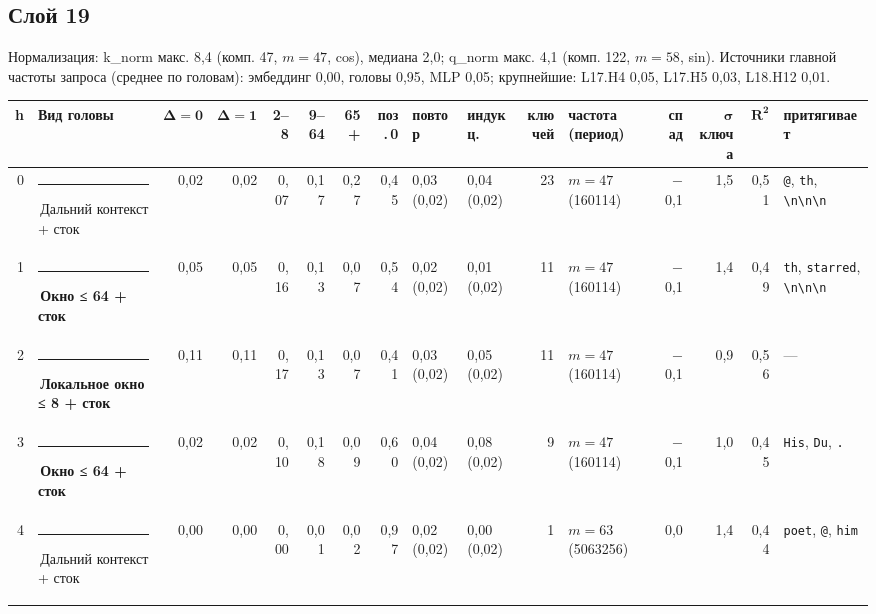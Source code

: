 \documentclass[10pt]{article}
\begin{document}
\noindent\begin{minipage}{\linewidth}
\subsection*{Слой 19}
{\small\color{ink2} Нормализация: k\_norm макс. 8,4 (комп. 47, $m{=}47$, cos), медиана 2,0; q\_norm макс. 4,1 (комп. 122, $m{=}58$, sin). Источники главной частоты запроса (среднее по головам): эмбеддинг 0,00, головы 0,95, MLP 0,05; крупнейшие: L17.H4 0,05, L17.H5 0,03, L18.H12 0,01.}
\begin{center}{\footnotesize\begin{tabular}{|r|l|r|r|r|r|r|r|l|l|r|l|r|r|r|l|}
\hline
\rowcolor{head}\textbf{h} & \textbf{Вид головы} & $\boldsymbol{\Delta{=}0}$ & $\boldsymbol{\Delta{=}1}$ & \textbf{2–8} & \textbf{9–64} & \textbf{65+} & \textbf{поз.\,0} & \textbf{повтор} & \textbf{индукц.} & \textbf{ключей} & \textbf{частота (период)} & \textbf{спад} & $\boldsymbol{\sigma}$ \textbf{ключа} & $\boldsymbol{R^2}$ & \textbf{притягивает} \\ \hline
0 & \textcolor[HTML]{C3C2B7}{\rule{0.62em}{0.62em}}\,Дальний контекст + сток & 0,02 & 0,02 & 0,07 & 0,17 & 0,27 & 0,45 & 0,03 (0,02) & 0,04 (0,02) & 23 & $m{=}47$ (160114) & $-$0,1 & 1,5 & 0,51 & \texttt{\textvisiblespace{}@}, \texttt{th}, \texttt{\textvisiblespace{}\textbackslash{}n\textbackslash{}n\textbackslash{}n} \\ \hline
1 & \textcolor[HTML]{EDA100}{\rule{0.62em}{0.62em}}\,\textbf{Окно ≤ 64 + сток} & 0,05 & 0,05 & 0,16 & 0,13 & 0,07 & 0,54 & 0,02 (0,02) & 0,01 (0,02) & 11 & $m{=}47$ (160114) & $-$0,1 & 1,4 & 0,49 & \texttt{th}, \texttt{\textvisiblespace{}starred}, \texttt{\textvisiblespace{}\textbackslash{}n\textbackslash{}n\textbackslash{}n} \\ \hline
2 & \textcolor[HTML]{1BAF7A}{\rule{0.62em}{0.62em}}\,\textbf{Локальное окно ≤ 8 + сток} & 0,11 & 0,11 & 0,17 & 0,13 & 0,07 & 0,41 & 0,03 (0,02) & 0,05 (0,02) & 11 & $m{=}47$ (160114) & $-$0,1 & 0,9 & 0,56 & — \\ \hline
3 & \textcolor[HTML]{EDA100}{\rule{0.62em}{0.62em}}\,\textbf{Окно ≤ 64 + сток} & 0,02 & 0,02 & 0,10 & 0,18 & 0,09 & 0,60 & 0,04 (0,02) & 0,08 (0,02) & 9 & $m{=}47$ (160114) & $-$0,1 & 1,0 & 0,45 & \texttt{\textvisiblespace{}His}, \texttt{\textvisiblespace{}Du}, \texttt{\textvisiblespace{}.} \\ \hline
4 & \textcolor[HTML]{C3C2B7}{\rule{0.62em}{0.62em}}\,Дальний контекст + сток & 0,00 & 0,00 & 0,00 & 0,01 & 0,02 & 0,97 & 0,02 (0,02) & 0,00 (0,02) & 1 & $m{=}63$ (5063256) & 0,0 & 1,4 & 0,44 & \texttt{\textvisiblespace{}poet}, \texttt{\textvisiblespace{}@}, \texttt{\textvisiblespace{}him} \\ \hline

\end{tabular}}
\end{center}
\end{minipage}
\end{document}
